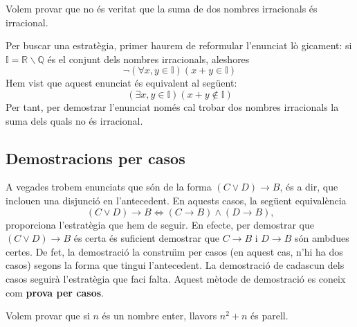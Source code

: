 \begin{exem}
Volem provar que no \'{e}s veritat que la suma de dos nombres irracionals
\'{e}s irracional.
\end{exem}

\begin{solucio}
Per buscar una estrat\`{e}gia, primer haurem de reformular l'enunciat l\`{o}%
gicament: si $\mathbb{I}=\mathbb{R}\smallsetminus\mathbb{Q}$ \'{e}s el
conjunt dels nombres irracionals, aleshores%
\begin{equation*}
\lnot\left( \forall x,y\in\mathbb{I}\right) \left( x+y\in\mathbb{I}\right)
\end{equation*}
Hem vist que aquest enunciat \'{e}s equivalent al seg\"{u}ent:%
\begin{equation*}
\left( \exists x,y\in\mathbb{I}\right) \left( x+y\notin\mathbb{I}\right)
\end{equation*}
Per tant, per demostrar l'enunciat nom\'{e}s cal trobar dos nombres
irracionals la suma dels quals no \'{e}s irracional.
\end{solucio}

\subsection{Demostracions per casos}

A vegades trobem enunciats que s\'{o}n de la forma $\left( C\vee D\right)
\longrightarrow B$, \'{e}s a dir, que inclouen una disjunci\'{o} en
l'antecedent. En aquests casos, la seg\"{u}ent equival\`{e}ncia
\begin{equation*}
\left( C\vee D\right) \longrightarrow B\Longleftrightarrow\left(
C\longrightarrow B\right) \wedge\left( D\longrightarrow B\right) \text{,}
\end{equation*}
proporciona l'estrat\`{e}gia que hem de seguir. En efecte, per demostrar que
$\left( C\vee D\right) \longrightarrow B$ \'{e}s certa \'{e}s suficient
demostrar que $C\longrightarrow B$ i $D\longrightarrow B$ s\'{o}n ambdues
certes. De fet, la demostraci\'{o} la constru\"{\i}m per casos (en aquest
cas, n'hi ha dos casos) segons la forma que tingui l'antecedent. La
demostraci\'{o} de cadascun dels casos seguir\`{a} l'estrat\`{e}gia que faci
falta. Aquest m\`{e}tode de demostraci\'{o} es coneix com \textbf{prova per
casos}.

\begin{exem}
Volem provar que si $n$ \'{e}s un nombre enter, llavors $n^{2}+n$ \'{e}s
parell.
\end{exem}

